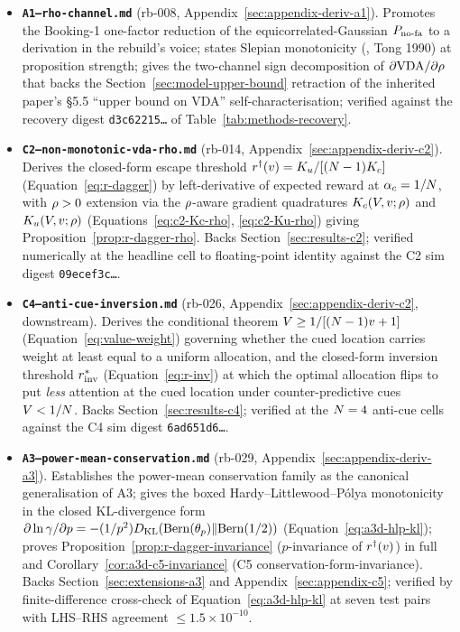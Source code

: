 \begin{itemize}
  \item \textbf{\texttt{A1--rho-channel.md}} (rb-008,
    Appendix~\ref{sec:appendix-deriv-a1}).  Promotes the
    Booking-1 one-factor reduction of the equicorrelated-Gaussian
    $P_{\mathrm{no\text{-}fa}}$ to a derivation in the rebuild's voice; states Slepian
    monotonicity (\cite{Slepian1962}, Tong 1990) at proposition
    strength; gives the two-channel sign decomposition of
    $\partial \mathrm{VDA} / \partial \rho$ that backs the
    Section~\ref{sec:model-upper-bound} retraction of the inherited
    paper's \S5.5 ``upper bound on VDA'' self-characterisation;
    verified against the recovery digest
    \texttt{d3c62215\ldots} of Table~\ref{tab:methods-recovery}.

  \item \textbf{\texttt{C2--non-monotonic-vda-rho.md}} (rb-014,
    Appendix~\ref{sec:appendix-deriv-c2}).  Derives the closed-form
    escape threshold $r^{\dagger}(v) = K_u/[(N - 1) K_c]$
    (Equation~\eqref{eq:r-dagger}) by left-derivative of expected
    reward at $\alpha_c = 1/N$, with $\rho > 0$ extension
    via the $\rho$-aware gradient quadratures
    $K_c(V, v; \rho)$ and $K_u(V, v; \rho)$
    (Equations~\eqref{eq:c2-Kc-rho}, \eqref{eq:c2-Ku-rho}) giving
    Proposition~\ref{prop:r-dagger-rho}.  Backs
    Section~\ref{sec:results-c2}; verified numerically at the
    headline cell to floating-point identity against the C2 sim
    digest \texttt{09ecef3c\ldots}.

  \item \textbf{\texttt{C4--anti-cue-inversion.md}} (rb-026,
    Appendix~\ref{sec:appendix-deriv-c2}, downstream).  Derives the
    conditional theorem $V \ge 1 / [(N - 1) v + 1]$
    (Equation~\eqref{eq:value-weight}) governing whether the cued
    location carries weight at least equal to a uniform allocation,
    and the closed-form inversion threshold $r^{*}_{\mathrm{inv}}$
    (Equation~\eqref{eq:r-inv}) at which the optimal allocation
    flips to put \emph{less} attention at the cued location under
    counter-predictive cues $V < 1/N$.  Backs
    Section~\ref{sec:results-c4}; verified at the $N = 4$
    anti-cue cells against the C4 sim digest \texttt{6ad651d6\ldots}.

  \item \textbf{\texttt{A3--power-mean-conservation.md}} (rb-029,
    Appendix~\ref{sec:appendix-deriv-a3}).  Establishes the
    power-mean conservation family as the canonical generalisation of
    A3; gives the boxed Hardy--Littlewood--P\'olya monotonicity in
    the closed KL-divergence form
    $\partial \ln \gamma / \partial p = -(1/p^2) D_{\mathrm{KL}}(\mathrm{Bern}(\theta_p) \| \mathrm{Bern}(1/2))$
    (Equation~\eqref{eq:a3d-hlp-kl}); proves
    Proposition~\ref{prop:r-dagger-invariance} ($p$-invariance of
    $r^{\dagger}(v)$) in full and Corollary~\ref{cor:a3d-c5-invariance}
    (C5 conservation-form-invariance).  Backs
    Section~\ref{sec:extensions-a3} and
    Appendix~\ref{sec:appendix-c5}; verified by finite-difference
    cross-check of Equation~\eqref{eq:a3d-hlp-kl} at seven test
    pairs with LHS--RHS agreement $\le 1.5 \times 10^{-10}$.
\end{itemize}

